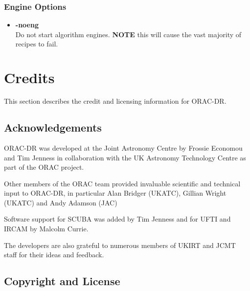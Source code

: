 \documentclass[twoside,11pt]{article}
\newcommand{\underscore}{\leavevmode\kern.04em\vbox{\hrule width 0.4em height 0.3pt}}
\newcommand{\xlabel}[1]{}
\renewcommand{\_}{\texttt{\symbol{95}}}
\begin{document}
\subsubsection*{Engine Options}%

\begin{itemize}

\item{\bf -noeng}%
%
\hfil\\
Do not start algorithm engines. {\bf NOTE} this will cause
the vast majority of recipes to fail.

\end{itemize}



\section{Credits\xlabel{credits}}%

This section describes the credit and licensing information for ORAC-DR.

\subsection*{Acknowledgements}%

ORAC-DR was developed at the Joint Astronomy Centre by
Frossie Economou and Tim Jenness in collaboration with the UK Astronomy Technology Centre as part of the ORAC project. 

Other members of the ORAC team provided invaluable scientific 
and technical input to ORAC-DR, in particular Alan Bridger (UKATC),
Gillian Wright (UKATC) and Andy Adamson (JAC)

Software support for SCUBA was added by Tim Jenness
and for UFTI and IRCAM by Malcolm Currie.

The developers are also grateful to numerous members of
UKIRT and JCMT staff for their ideas and feedback.

\subsection*{Copyright and License}%
\end{document}
